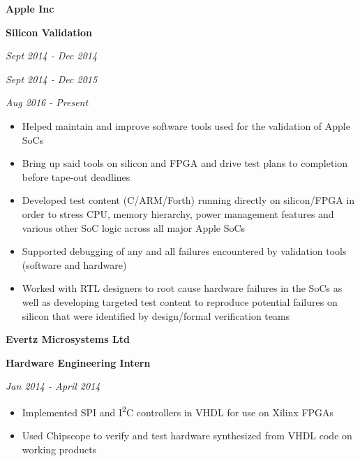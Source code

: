 \documentclass{article}
\newenvironment{name}{\fontfamily{phv}\selectfont\bfseries\normalsize}{\par}
\newenvironment{colorheading}{\fontfamily{phv}\selectfont\bfseries\normalsize\color{darkcyan}}{\par}
\newenvironment{metadata}{\fontfamily{phv}\selectfont\itshape\small\color{darkgray}}{\par}
\newenvironment{itemizedbody}{\fontfamily{phv}\selectfont\small\begin{itemize}}{\end{itemize}\par}
\newenvironment{experience}[2]%
{%
  \begin{minipage}{0.6\linewidth}\begin{flushleft}#1\end{flushleft}\end{minipage}%
  \hfill%
  \begin{minipage}{0.3\linewidth}\begin{flushright}#2\end{flushright}\end{minipage}%
}%
{}
\newcommand{\lineitem}{\item[{$\to$}]}
\begin{document}
  \begin{minipage}[t]{0.6\linewidth}
    \begin{experience}
    {
      \begin{name}Apple Inc\end{name}
      \begin{colorheading}Silicon Validation\end{colorheading}
    }
    {
      \begin{metadata}Sept 2014 - Dec 2014\end{metadata}
      \begin{metadata}Sept 2014 - Dec 2015\end{metadata}
      \begin{metadata}Aug 2016 - Present\end{metadata}
    }
    \end{experience}
    \begin{itemizedbody}
      \lineitem Helped maintain and improve software tools used for the validation of Apple SoCs
      \lineitem Bring up said tools on silicon and FPGA and drive test plans to completion before tape-out deadlines
      \lineitem Developed test content (C/ARM/Forth) running directly on silicon/FPGA in order to stress CPU,
                memory hierarchy, power management features and various other SoC logic across all major Apple SoCs
      \lineitem Supported debugging of any and all failures encountered by validation tools (software and hardware)
      \lineitem Worked with RTL designers to root cause hardware failures in the SoCs as well as developing targeted
                test content to reproduce potential failures on silicon that were identified by design/formal
                verification teams
    \end{itemizedbody}
    \smallskip
    \begin{experience}
    {
      \begin{name}Evertz Microsystems Ltd\end{name}
      \begin{colorheading}Hardware Engineering Intern\end{colorheading}
    }
    {
      \begin{metadata}Jan 2014 - April 2014\end{metadata}
    }
    \end{experience}
    \begin{itemizedbody}
      \lineitem Implemented SPI and I\textsuperscript{2}C controllers in VHDL for use on Xilinx FPGAs
      \lineitem Used Chipscope to verify and test hardware synthesized from VHDL code on working products

\end{itemizedbody}
\end{minipage}
\end{document}

